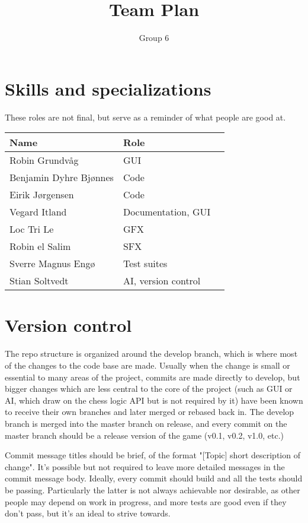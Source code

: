 \documentclass{article}
\title{Team Plan}
\author{Group 6}
\begin{document}
\maketitle

\section*{Skills and specializations}

These roles are not final, but serve as a reminder of what people are good at. \\

\begin{tabular}{l l l}
    Name                   & Role \\
    \midrule
    Robin Grundvåg         & GUI \\
    Benjamin Dyhre Bjønnes & Code \\
    Eirik Jørgensen        & Code \\
    Vegard Itland          & Documentation, GUI \\
    Loc Tri Le             & GFX \\
    Robin el Salim         & SFX \\
    Sverre Magnus Engø     & Test suites \\
    Stian Soltvedt         & AI, version control\\
\end{tabular}

\section*{Version control}

The repo structure is organized around the develop branch, which is where most of the changes to the code base are made. Usually when the change is small or essential to many areas of the project, commits are made directly to develop, but bigger changes which are less central to the core of the project (such as GUI or AI, which draw on the chess logic API but is not required by it) have been known to receive their own branches and later merged or rebased back in. The develop branch is merged into the master branch on release, and every commit on the master branch should be a release version of the game (v0.1, v0.2, v1.0, etc.)

Commit message titles should be brief, of the format "[Topic] short description of change". It's possible but not required to leave more detailed messages in the commit message body. Ideally, every commit should build and all the tests should be passing. Particularly the latter is not always achievable nor desirable, as other people may depend on work in progress, and more tests are good even if they don't pass, but it's an ideal to strive towards.
\end{document}
